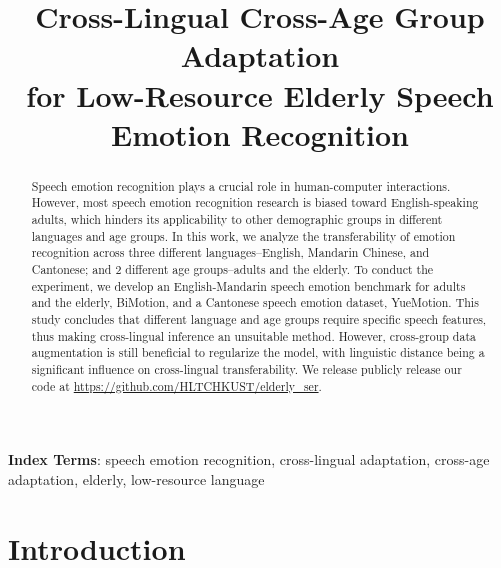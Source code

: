 \documentclass{INTERSPEECH2023}
\title{Cross-Lingual Cross-Age Group Adaptation\\for Low-Resource Elderly Speech Emotion Recognition}
\begin{document}
\maketitle
 
\begin{abstract}

Speech emotion recognition plays a crucial role in human-computer interactions. However, most speech emotion recognition research is biased toward English-speaking adults, which hinders its applicability to other demographic groups in different languages and age groups. In this work, we analyze the transferability of emotion recognition across three different languages--English, Mandarin Chinese, and Cantonese; and 2 different age groups--adults and the elderly. To conduct the experiment, we develop an English-Mandarin speech emotion benchmark for adults and the elderly, BiMotion, and a Cantonese speech emotion dataset, YueMotion. This study concludes that different language and age groups require specific speech features, thus making cross-lingual inference an unsuitable method. However, cross-group data augmentation is still beneficial to regularize the model, with linguistic distance being a significant influence on cross-lingual transferability. We release publicly release our code at \url{https://github.com/HLTCHKUST/elderly_ser}.

\end{abstract}
\noindent\textbf{Index Terms}: speech emotion recognition, cross-lingual adaptation, cross-age adaptation, elderly, low-resource language

\section{Introduction}
\end{document}
